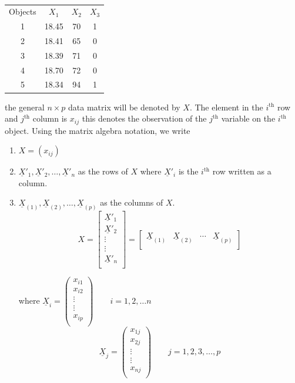 \documentclass[11pt,a4paper]{article}
\theoremstyle{definition}
\begin{document}
\begin{table}[H]
\centering
\begin{tabular}{cccc}
Objects & $X_1$ & $X_2$ & $X_3$\\
1 & 18.45 & 70 & 1\\
2 & 18.41 & 65 & 0\\
3 & 18.39 & 71 & 0\\
4 & 18.70 & 72 & 0\\
5 & 18.34 & 94 & 1\\
\end{tabular}
\caption{}
\label{tab:data 1}
\end{table}




the general $n\times p$ data matrix will be denoted by $X$. The element in the $i^{\text{th}}$ row and $j^{\text{th}}$ column is $x_{ij}$ this denotes the observation of the $j^{\text{th}}$ variable on the $i^{\text{th}}$ object. Using the matrix algebra notation, we write
\begin{enumerate}
\item $X=(x_{ij})$
\item $\underline{X}'_1, \underline{X}'_2,\ldots,\underline{X}'_n$ as the rows of  $X$ where $\underline{X}'_i$ is the $i^{\text{th}}$ row written as a column.
\item $\underline{X}_{(1)},\underline{X}_{(2)},\ldots,\underline{X}_{(p)}$ as the columns of $X$.
$$X=
\begin{bmatrix}
\underline{X}'_1 \\ \underline{X}'_2 \\ \vdots\\ \vdots\\ \underline{X}'_n\\ 
\end{bmatrix}
=
\begin{bmatrix}
\underline{X}_{(1)} & \underline{X}_{(2)}& \cdots& \underline{X}_{(p)}\\
\end{bmatrix}
 $$
 
where $\underline{X}_i=
\begin{pmatrix}
x_{i1}\\
x_{i2}\\
\vdots\\
\vdots\\
x_{ip}\\
\end{pmatrix}\qquad i=1,2,\ldots n
$\\

$$\underline{X}_j=
\begin{pmatrix}
x_{1j}\\
x_{2j}\\
\vdots\\
\vdots\\
x_{nj}\\
\end{pmatrix}
\qquad j=1,2,3,\ldots,p
$$
\end{enumerate}
\end{document}
